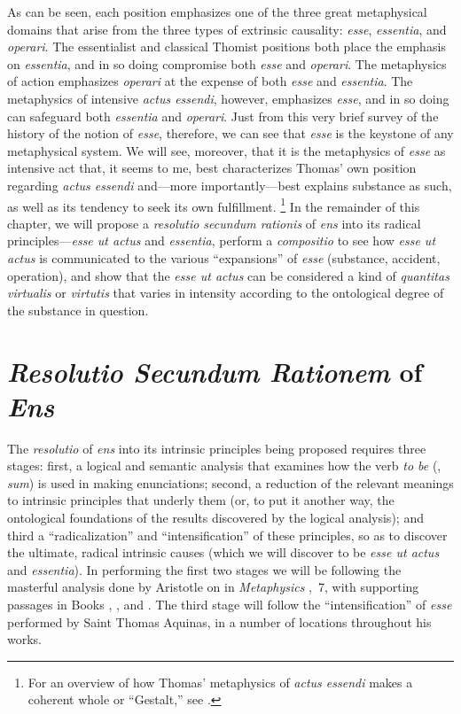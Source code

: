 As can be seen, each position emphasizes one of the three great metaphysical domains that arise from the three types of extrinsic causality: \emph{esse}, \emph{essentia}, and \emph{operari}. The essentialist and classical Thomist positions both place the emphasis on \emph{essentia}, and in so doing compromise both \emph{esse} and \emph{operari}. The metaphysics of action emphasizes \emph{operari} at the expense of both \emph{esse} and \emph{essentia}. The metaphysics of intensive \emph{actus essendi}, however, emphasizes \emph{esse}, and in so doing can safeguard both \emph{essentia} and \emph{operari}. Just from this very brief survey of the history of the notion of \emph{esse}, therefore, we can see that \emph{esse} is the keystone of any metaphysical system. We will see, moreover, that it is the metaphysics of \emph{esse} as intensive act that, it seems to me, best characterizes Thomas' own position regarding \emph{actus essendi} and---more importantly---best explains substance as such, as well as its tendency to seek its own fulfillment.%
%
\footnote{For an overview of how Thomas' metaphysics of \emph{actus essendi} makes a coherent whole or ``Gestalt,'' see \cite{villagrasa:gestalt}.}
%
In the remainder of this chapter, we will propose a \emph{resolutio secundum rationis} of \emph{ens} into its radical principles---\emph{esse ut actus} and \emph{essentia}, perform a \emph{compositio} to see how \emph{esse ut actus} is communicated to the various ``expansions'' of \emph{esse} (substance, accident, operation), and show that the \emph{esse ut actus} can be considered a kind of \emph{quantitas virtualis} or \emph{virtutis} that varies in intensity according to the ontological degree of the substance in question.

\section{\emph{Resolutio Secundum Rationem} of \emph{Ens}}

The \emph{resolutio} of \emph{ens} into its intrinsic principles being proposed requires three stages: first, a logical and semantic analysis that examines how the verb \emph{to be} (, \emph{sum}) is used in making enunciations; second, a reduction of the relevant meanings to intrinsic principles that underly them (or, to put it another way, the ontological foundations of the results discovered by the logical analysis); and third a ``radicalization'' and ``intensification'' of these principles, so as to discover the ultimate, radical intrinsic causes (which we will discover to be \emph{esse ut actus} and \emph{essentia}). In performing the first two stages we will be following the masterful analysis done by Aristotle on  in \emph{Metaphysics} ,~7, with supporting passages in Books , , and . The third stage will follow the ``intensification'' of \emph{esse} performed by Saint Thomas Aquinas, in a number of locations throughout his works.

